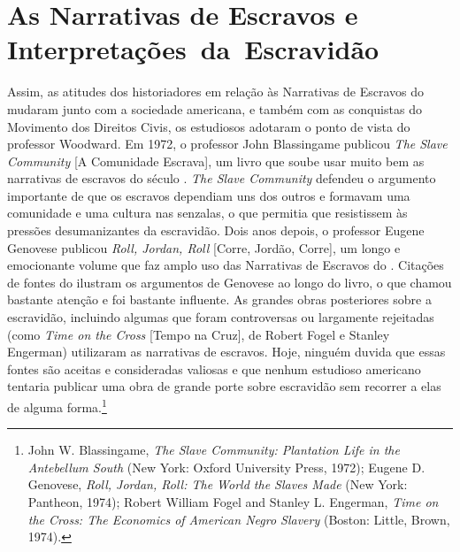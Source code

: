 \section{As Narrativas de Escravos e Interpretações~da~Escravidão}

Assim, as atitudes dos historiadores em relação às Narrativas de
Escravos do  mudaram junto com a sociedade americana, e também com as
conquistas do Movimento dos Direitos Civis, os estudiosos adotaram o
ponto de vista do professor Woodward. Em 1972, o professor John
Blassingame publicou \emph{The Slave Community} {[}A Comunidade
Escrava{]}, um livro que soube usar muito bem as narrativas de escravos
do século . \emph{The Slave Community} defendeu o argumento
importante de que os escravos dependiam uns dos outros e formavam uma
comunidade e uma cultura nas senzalas, o que permitia que resistissem às
pressões desumanizantes da escravidão. Dois anos depois, o professor
Eugene Genovese publicou \emph{Roll, Jordan, Roll} {[}Corre, Jordão,
Corre{]}, um longo e emocionante volume que faz amplo uso das Narrativas
de Escravos do . Citações de fontes do  ilustram os argumentos de
Genovese ao longo do livro, o que chamou bastante atenção e foi bastante
influente. As grandes obras posteriores sobre a escravidão, incluindo
algumas que foram controversas ou largamente rejeitadas (como \emph{Time
on the Cross} {[}Tempo na Cruz{]}, de Robert Fogel e Stanley Engerman)
utilizaram as narrativas de escravos. Hoje, ninguém duvida que essas
fontes são aceitas e consideradas valiosas e que nenhum estudioso
americano tentaria publicar uma obra de grande porte sobre escravidão
sem recorrer a elas de alguma forma.\footnote{John W. Blassingame,
  \emph{The Slave Community: Plantation Life in the Antebellum South}
  (New York: Oxford University Press, 1972); Eugene D. Genovese,
  \emph{Roll, Jordan, Roll: The World the Slaves Made} (New York:
  Pantheon, 1974); Robert William Fogel and Stanley L. Engerman,
  \emph{Time on the Cross: The Economics of American Negro Slavery}
  (Boston: Little, Brown, 1974).}

